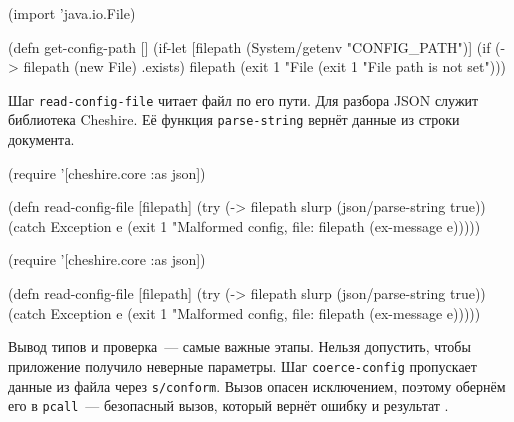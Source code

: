 \else

\begin{english}
  \begin{clojure}
(import 'java.io.File)

(defn get-config-path []
  (if-let [filepath (System/getenv "CONFIG_PATH")]
    (if (-> filepath (new File) .exists)
      filepath
      (exit 1 "File %
    (exit 1 "File path is not set")))
  \end{clojure}
\end{english}

\fi

Шаг \verb|read-config-file| читает файл по его пути. Для разбора JSON служит
библиотека Cheshire. Её функция \verb|parse-string| вернёт данные из строки
документа.


\ifx\DEVICETYPE\MOBILE

\begin{english}
  \begin{clojure}
(require '[cheshire.core :as json])

(defn read-config-file
  [filepath]
  (try
    (-> filepath
        slurp
        (json/parse-string true))
    (catch Exception e
      (exit 1
        "Malformed config,
                   file: %
            filepath (ex-message e)))))
  \end{clojure}
\end{english}

\else

\begin{english}
  \begin{clojure}
(require '[cheshire.core :as json])

(defn read-config-file
  [filepath]
  (try
    (-> filepath slurp (json/parse-string true))
    (catch Exception e
      (exit 1 "Malformed config, file: %
            filepath (ex-message e)))))
  \end{clojure}
\end{english}

\fi


Вывод типов и проверка~--- самые важные этапы. Нельзя допустить, чтобы
приложение получило неверные параметры. Шаг \verb|coerce-config| пропускает
данные из файла через \verb|s/conform|. Вызов опасен исключением, поэтому
обернём его в \verb|pcall|~--- безопасный вызов, который вернёт ошибку и
результат .

